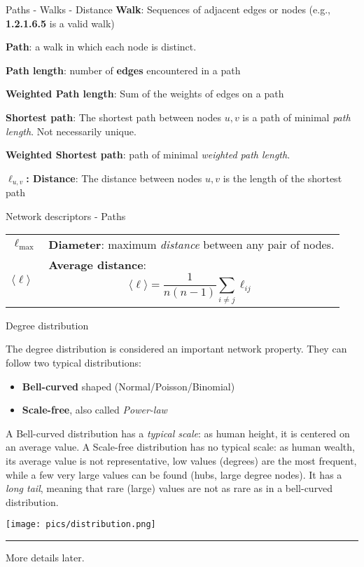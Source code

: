 \begin{textbox}{Paths - Walks - Distance}
    \textbf{Walk}: Sequences of adjacent edges or nodes (e.g., \textbf{1.2.1.6.5} is a valid walk)

    \textbf{Path}: a walk in which each node is distinct.

    \textbf{Path length}: number of \textbf{edges} encountered in a path

    \textbf{Weighted Path length}: Sum of the weights of edges on a path


    \textbf{Shortest path}: The shortest path between nodes $u,v$ is a path of minimal \textit{path length}. Not necessarily unique.

    \textbf{Weighted Shortest path}: path of minimal \textit{weighted path length}.


    \textbf{$\ell_{u,v}$: Distance}: The distance between nodes $u,v$ is the length of the shortest path


\end{textbox}

\begin{textbox}{Network descriptors - Paths}
    \begin{tabular}{p{}|p{}}\scriptsize
        $\ell_{\max}$          & \textbf{Diameter}: maximum \textit{distance} between any pair of nodes. \\


        $\langle \ell \rangle$ & \textbf{Average distance}:
        \[
            \langle \ell \rangle = \frac{1}{n(n-1)}\sum_{i\neq j} \ell_{ij}
        \]                                                                                               \\
    \end{tabular}

\end{textbox}


\begin{textbox}{Degree distribution}

    The degree distribution is considered an important network property. They can follow two typical distributions:
    \begin{itemize}
        \item \textbf{Bell-curved} shaped (Normal/Poisson/Binomial)
        \item \textbf{Scale-free}, also called \textit{Power-law}
    \end{itemize}
    A Bell-curved distribution has a \textit{typical scale}: as human height, it is centered on an average value. A Scale-free distribution has no typical scale: as human wealth, its average value is not representative, low values (degrees) are the most frequent, while a few very large values can be found (hubs, large degree nodes). It has a \textit{long tail}, meaning that rare (large) values are not as rare as in a bell-curved distribution.

    \centering
    \texttt{[image: pics/distribution.png]}


    \noindent\rule{4cm}{0.1pt}

    \tiny{
        More details later.}
\end{textbox}

